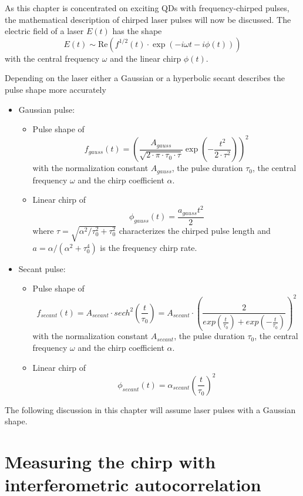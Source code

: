 As this chapter is concentrated on exciting \acp{QD} with frequency-chirped pulses, the mathematical description of chirped laser pulses will now be discussed. The electric field of a laser $E(t)$ has the shape
\begin{equation}
\label{eq:electric-field-laser}
E(t) \sim \mathrm{Re}\left(f^{1/2}(t) \cdot \exp\left(-i \omega t - i \phi(t)\right)\right)
\end{equation}
with the central frequency $\omega$ and the linear chirp $\phi(t)$.

Depending on the laser either a Gaussian or a hyperbolic secant describes the pulse shape more accurately~\cite{glassl_biexciton_2013, hirayama_real-time_2002}

\begin{itemize}
	\item Gaussian pulse:
	\begin{itemize}
		\item Pulse shape of
		$$f_{gauss}(t) = \left(\frac{A_{gauss}}{\sqrt{2 \cdot \pi \cdot \tau_0 \cdot \tau}} \exp\left(-\frac{t^2}{2 \cdot \tau^2}\right)\right)^2$$
		with the normalization constant $A_{gauss}$, the pulse duration $\tau_0$, the central frequency $\omega$ and the chirp coefficient $\alpha$.
		\item Linear chirp of
		$$\phi_{gauss}(t) = \frac{a_{gauss} t^2}{2}$$
		where $\tau = \sqrt{\alpha^2 / \tau_0^2 + \tau_0^2}$ characterizes the chirped pulse length and $a = \alpha / (\alpha ^ 2 + \tau _0 ^ 4)$ is the frequency chirp rate.
	\end{itemize}
	\item Secant pulse:
	\begin{itemize}
		\item Pulse shape of
		$$f_{secant}(t) = A_{secant} \cdot sech^2\left(\frac{t}{\tau_0}\right) = A_{secant} \cdot \left(\frac{2}{exp(\frac{t}{\tau_0}) + exp(-\frac{t}{\tau_0})}\right)^2$$
		with the normalization constant $A_{secant}$, the pulse duration $\tau_0$, the central frequency $\omega$ and the chirp coefficient $\alpha$.
		\item Linear chirp of
		$$\phi_{secant}(t) = \alpha_{secant}\left(\frac{t}{\tau_0}\right)^2$$
	\end{itemize}
\end{itemize}
	
The following discussion in this chapter will assume laser pulses with a Gaussian shape. 


\section{Measuring the chirp with interferometric autocorrelation}

